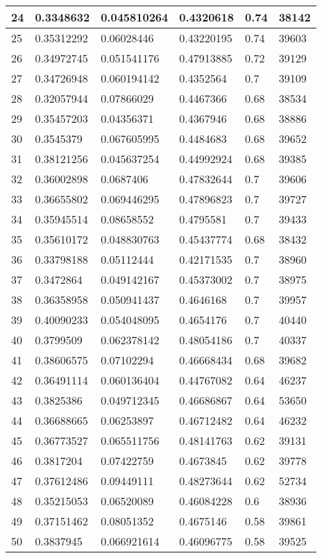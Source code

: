 \begin{longtable}{|l|l|l|l|l|l|}
24 & 0.3348632 & 0.045810264 & 0.4320618 & 0.74 & 38142 \\ \hline 
25 & 0.35312292 & 0.06028446 & 0.43220195 & 0.74 & 39603 \\ \hline 
26 & 0.34972745 & 0.051541176 & 0.47913885 & 0.72 & 39129 \\ \hline 
27 & 0.34726948 & 0.060194142 & 0.4352564 & 0.7 & 39109 \\ \hline 
28 & 0.32057944 & 0.07866029 & 0.4467366 & 0.68 & 38534 \\ \hline 
29 & 0.35457203 & 0.04356371 & 0.4367946 & 0.68 & 38886 \\ \hline 
30 & 0.3545379 & 0.067605995 & 0.4484683 & 0.68 & 39652 \\ \hline 
31 & 0.38121256 & 0.045637254 & 0.44992924 & 0.68 & 39385 \\ \hline 
32 & 0.36002898 & 0.0687406 & 0.47832644 & 0.7 & 39606 \\ \hline 
33 & 0.36655802 & 0.069446295 & 0.47896823 & 0.7 & 39727 \\ \hline 
34 & 0.35945514 & 0.08658552 & 0.4795581 & 0.7 & 39433 \\ \hline 
35 & 0.35610172 & 0.048830763 & 0.45437774 & 0.68 & 38432 \\ \hline 
36 & 0.33798188 & 0.05112444 & 0.42171535 & 0.7 & 38960 \\ \hline 
37 & 0.3472864 & 0.049142167 & 0.45373002 & 0.7 & 38975 \\ \hline 
38 & 0.36358958 & 0.050941437 & 0.4646168 & 0.7 & 39957 \\ \hline 
39 & 0.40090233 & 0.054048095 & 0.4654176 & 0.7 & 40440 \\ \hline 
40 & 0.3799509 & 0.062378142 & 0.48054186 & 0.7 & 40337 \\ \hline 
41 & 0.38606575 & 0.07102294 & 0.46668434 & 0.68 & 39682 \\ \hline 
42 & 0.36491114 & 0.060136404 & 0.44767082 & 0.64 & 46237 \\ \hline 
43 & 0.3825386 & 0.049712345 & 0.46686867 & 0.64 & 53650 \\ \hline 
44 & 0.36688665 & 0.06253897 & 0.46712482 & 0.64 & 46232 \\ \hline 
45 & 0.36773527 & 0.065511756 & 0.48141763 & 0.62 & 39131 \\ \hline 
46 & 0.3817204 & 0.07422759 & 0.4673845 & 0.62 & 39778 \\ \hline 
47 & 0.37612486 & 0.09449111 & 0.48273644 & 0.62 & 52734 \\ \hline 
48 & 0.35215053 & 0.06520089 & 0.46084228 & 0.6 & 38936 \\ \hline 
49 & 0.37151462 & 0.08051352 & 0.4675146 & 0.58 & 39861 \\ \hline 
50 & 0.3837945 & 0.066921614 & 0.46096775 & 0.58 & 39525 \\ \hline 
\end{longtable}
